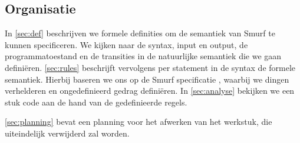\subsection{Organisatie} %

In \autoref{sec:def} beschrijven we formele definities om de semantiek van
Smurf te kunnen specificeren. We kijken naar de syntax, input en output, de
programmatoestand en de transities in de natuurlijke semantiek die we gaan
definiëren. \autoref{sec:rules} beschrijft vervolgens per statement in de
syntax de formele semantiek. Hierbij baseren we ons op de Smurf specificatie
\cite{safalra}, waarbij we dingen verhelderen en ongedefinieerd gedrag
definiëren. In \autoref{sec:analyse} bekijken we een stuk code aan de hand van
de gedefinieerde regels.

\autoref{sec:planning} bevat een planning voor het afwerken van het werkstuk,
die uiteindelijk verwijderd zal worden.

